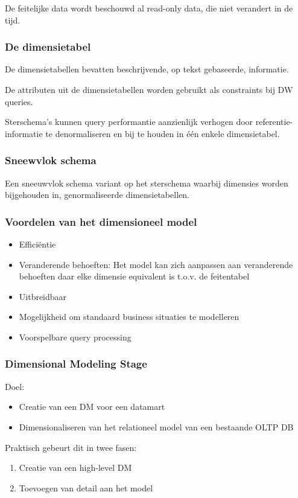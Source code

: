 \documentclass[a4paper,12pt]{article}
\begin{document}
De feitelijke data wordt beschouwd al read-only data, die niet verandert in de tijd.

\subsubsection{De dimensietabel}
De dimensietabellen bevatten beschrijvende, op tekst gebaseerde, informatie.

De attributen uit de dimensietabellen worden gebruikt als constraints bij DW queries.

Sterschema's kunnen query performantie aanzienlijk verhogen door referentie-informatie te denormaliseren en bij te houden in één enkele dimensietabel.

\subsubsection{Sneewvlok schema}
Een sneeuwvlok schema variant op het sterschema waarbij dimensies worden bijgehouden in, genormaliseerde dimensietabellen.

\subsubsection{Voordelen van het dimensioneel model}
\begin{itemize}
\item Efficiëntie
\item Veranderende behoeften: Het model kan zich aanpassen aan veranderende behoeften daar elke dimensie equivalent is t.o.v. de feitentabel
\item Uitbreidbaar
\item Mogelijkheid om standaard business situaties te modelleren
\item Voorspelbare query processing
\end{itemize}

\subsubsection{Dimensional Modeling Stage}
Doel:
\begin{itemize}
\item Creatie van een DM voor een datamart
\item Dimensionaliseren van het relationeel model van een bestaande OLTP DB
\end{itemize}

Praktisch gebeurt dit in twee fasen:
\begin{enumerate}
\item Creatie van een high-level DM
\item Toevoegen van detail aan het model
\end{enumerate}
\end{document}
